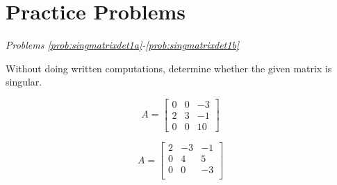 \documentclass{ximera}
\begin{document}






\section*{Practice Problems}
\emph{Problems \ref{prob:singmatrixdet1a}-\ref{prob:singmatrixdet1b}}

Without doing written computations, determine whether the given matrix is singular. 

  \begin{problem}\label{prob:singmatrixdet1a}
  $$A=\begin{bmatrix}0&0&-3\\2&3&-1\\0&0&10\end{bmatrix}$$
  \begin{multipleChoice}
  \end{multipleChoice}
  \end{problem}

\begin{problem}\label{prob:singmatrixdet1b}
  $$A=\begin{bmatrix}2&-3&-1\\0&4&5\\0&0&-3\\\end{bmatrix}$$
  \begin{multipleChoice}
  \end{multipleChoice}
  \end{problem}
\end{document}
